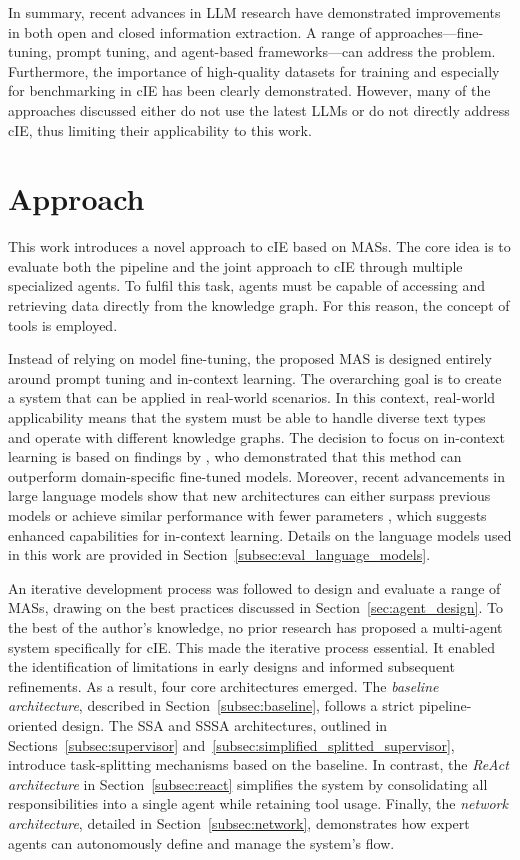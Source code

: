 \documentclass[a4paper,oneside,bibliography=totoc]{scrbook}
\begin{document}
In summary, recent advances in \ac{LLM} research have demonstrated improvements in both open and closed information extraction. A range of approaches—fine-tuning, prompt tuning, and agent-based frameworks—can address the problem. Furthermore, the importance of high-quality datasets for training and especially for benchmarking in \ac{cIE} has been clearly demonstrated. However, many of the approaches discussed either do not use the latest \acp{LLM} or do not directly address \ac{cIE}, thus limiting their applicability to this work.

\chapter{Approach}
\label{ch:approach}

This work introduces a novel approach to \ac{cIE} based on \acp{MAS}. The core idea is to evaluate both the pipeline and the joint approach to \ac{cIE} through multiple specialized agents. To fulfil this task, agents must be capable of accessing and retrieving data directly from the knowledge graph. For this reason, the concept of tools is employed.

Instead of relying on model fine-tuning, the proposed \ac{MAS} is designed entirely around prompt tuning and in-context learning. The overarching goal is to create a system that can be applied in real-world scenarios. In this context, real-world applicability means that the system must be able to handle diverse text types and operate with different knowledge graphs. The decision to focus on in-context learning is based on findings by \citet{Brown2020}, who demonstrated that this method can outperform domain-specific fine-tuned models. Moreover, recent advancements in large language models show that new architectures can either surpass previous models or achieve similar performance with fewer parameters \cite{MetaAI2025,Chiang2024}, which suggests enhanced capabilities for in-context learning. Details on the language models used in this work are provided in Section~\ref{subsec:eval_language_models}.

An iterative development process was followed to design and evaluate a range of \acp{MAS}, drawing on the best practices discussed in Section~\ref{sec:agent_design}. To the best of the author's knowledge, no prior research has proposed a multi-agent system specifically for \ac{cIE}. This made the iterative process essential. It enabled the identification of limitations in early designs and informed subsequent refinements. As a result, four core architectures emerged. The \textit{baseline architecture}, described in Section~\ref{subsec:baseline}, follows a strict pipeline-oriented design. The \ac{SSA} and \ac{SSSA} architectures, outlined in Sections~\ref{subsec:supervisor} and~\ref{subsec:simplified_splitted_supervisor}, introduce task-splitting mechanisms based on the baseline. In contrast, the \textit{ReAct architecture} in Section~\ref{subsec:react} simplifies the system by consolidating all responsibilities into a single agent while retaining tool usage. Finally, the \textit{network architecture}, detailed in Section~\ref{subsec:network}, demonstrates how expert agents can autonomously define and manage the system's flow.
\end{document}
